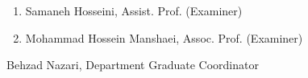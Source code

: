 \begin{latin}
\begin{enumerate}
%
\item Samaneh Hosseini, Assist. Prof. (Examiner)
\vspace{0.5cm}

\item Mohammad Hossein Manshaei, Assoc. Prof. (Examiner)
\vspace{0.5cm}

\end{enumerate}

Behzad Nazari, Department Graduate Coordinator

\pagebreak
\end{latin}

\thispagestyle{empty}
\mbox{}

